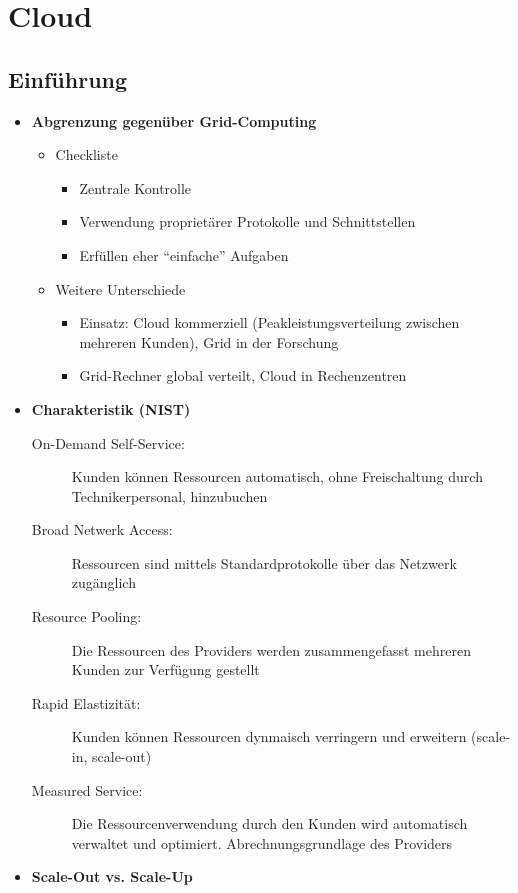 \section{Cloud}

\subsection{Einführung}
\begin{itemize}
	\item \textbf{Abgrenzung gegenüber Grid-Computing}
	\begin{itemize}
		\item Checkliste
		\begin{itemize}
			\item Zentrale Kontrolle
			\item Verwendung proprietärer Protokolle und Schnittstellen
			\item Erfüllen eher "`einfache"' Aufgaben
		\end{itemize}
		\item Weitere Unterschiede
		\begin{itemize}
			\item Einsatz: Cloud kommerziell (Peakleistungsverteilung zwischen mehreren Kunden), Grid in der Forschung
			\item Grid-Rechner global verteilt, Cloud in Rechenzentren
		\end{itemize}
	\end{itemize}
	\item \textbf{Charakteristik (NIST)}
	\begin{description}
		\item[On-Demand Self-Service:] Kunden können Ressourcen automatisch, ohne Freischaltung durch Technikerpersonal, hinzubuchen
		\item[Broad Netwerk Access:] Ressourcen sind mittels Standardprotokolle über das Netzwerk zugänglich
		\item[Resource Pooling:] Die Ressourcen des Providers werden zusammengefasst mehreren Kunden zur Verfügung gestellt
		\item[Rapid Elastizität:] Kunden können Ressourcen dynmaisch verringern und erweitern (scale-in, scale-out)
		\item[Measured Service:] Die Ressourcenverwendung durch den Kunden wird automatisch verwaltet und optimiert. Abrechnungsgrundlage des Providers
	\end{description}
	\item \textbf{Scale-Out vs. Scale-Up}

\end{itemize}
